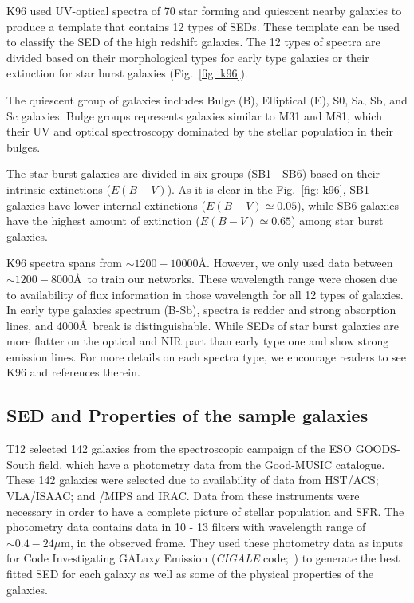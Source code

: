     K96 used UV-optical spectra of 70 star forming and quiescent nearby galaxies to produce a template that contains 12 types of SEDs.
    These template can be used to classify the SED of the high redshift galaxies. 
    The 12 types of spectra are divided based on their morphological types for early type galaxies or their extinction for star burst galaxies (Fig.~\ref{fig: k96}). 


    The quiescent group of galaxies includes Bulge (B), Elliptical (E), S0, Sa, Sb, and Sc galaxies.
    Bulge groups represents galaxies similar to M31 and M81, which their UV and optical spectroscopy dominated by the stellar population in their bulges.
    
    The star burst galaxies are divided in six groups (SB1 - SB6) based on their intrinsic extinctions ($E(B-V)$). 
    As it is clear in the Fig.~\ref{fig: k96}, SB1 galaxies have lower internal extinctions ($E(B-V) \simeq 0.05$), while SB6 galaxies have the highest amount of extinction ($E(B-V) \simeq 0.65$) among star burst galaxies.
    
    K96 spectra spans from $\sim1200-10000$\AA.
    However, we only used data between $\sim1200-8000$\AA~to train our networks. 
    These wavelength range were chosen due to availability of flux information in those wavelength for all 12 types of galaxies.
    In early type galaxies spectrum (B-Sb), spectra is redder and strong absorption lines, and 4000\AA~break is distinguishable. 
    While SEDs of star burst galaxies are more flatter on the optical and NIR part than early type one and show strong emission lines.
    For more details on each spectra type, we encourage readers to see K96 and references therein. 
    

 \subsection{SED and Properties of the sample galaxies}
    T12 selected 142 galaxies from the spectroscopic campaign of the ESO GOODS-South field, which have a photometry data from the Good-MUSIC catalogue.
    These 142 galaxies were selected due to availability of data from HST/ACS; VLA/ISAAC; and \Spitzer/MIPS and IRAC. 
    Data from these instruments were necessary in order to have a complete picture of stellar population and SFR.
    The photometry data contains data in 10 - 13 filters with wavelength range of $\sim 0.4-24 \mu$m, in the observed frame. %
    They used these photometry data as inputs for Code Investigating GALaxy Emission ({\em CIGALE} code;~\citep[][hereafter N09]{Noll09}) to generate the best fitted SED for each galaxy as well as some of the physical properties of the galaxies.
    
